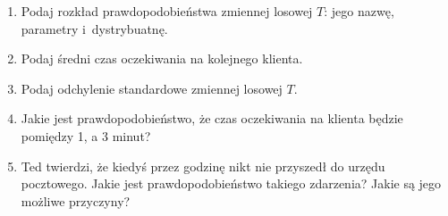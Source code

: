 \documentclass[twoside]{mwart}
\newcommand{\ans}[1]{}
\newenvironment{ansenv}{\comment}{\endcomment}
\newenvironment{ansenv}{\paragraph{Odpowiedź:}}{}
\newcommand{\ans}[1]{\begin{ansenv}#1\end{ansenv}}
\begin{document}
\begin{enumerate}
\begin{enumerate}
\item Podaj rozkład prawdopodobieństwa zmiennej losowej $T$: jego nazwę, parametry i~dystrybuatnę.
\ans
{
Rozkład wykładniczy
\begin{gather*}
F(x) = \begin{cases} 1-e^{-\lambda x} & x>0 \\ 0 & \text{wpp} \end{cases} \\
P(T<2)=F(2)=\frac{48}{50} \\
1-e^{-2\lambda}=\frac{24}{25} \\
e^{-2\lambda}=\frac{1}{25} \\ 
-2\lambda = \ln \frac{1}{25} = -2 \ln 5 \\
\lambda = \ln 5 \approx 1{,}609
\end{gather*}
}
\item Podaj średni czas oczekiwania na kolejnego klienta.
\ans{ $ET = \frac{1}{\lambda} = \frac{1}{\ln 5} \approx 0{,}621$ }
\item Podaj odchylenie standardowe zmiennej losowej $T$.
\ans{$DT=ET=\frac{1}{\lambda} = \frac{1}{\ln 5} \approx 0{,}621$ }
\item Jakie jest prawdopodobieństwo, że czas oczekiwania na klienta będzie pomiędzy 1, a 3 minut?
\ans{$P(1\leq T\leq 3) = F(3)-F(1) = 1-e^{-3\lambda}-(1-e^{-\lambda}) = e^{-\lambda}-e^{-3\lambda}=5^{-1}-5^{-3}=\frac{5^2-1}{5^3}=\frac{24}{125}=0{,}192$}
\item Ted twierdzi, że kiedyś przez godzinę nikt nie przyszedł do urzędu pocztowego. Jakie jest prawdopodobieństwo takiego zdarzenia? Jakie są jego możliwe przyczyny?
\ans{$P(T>60)=1-F(60)=1-(1-e^{-60\lambda}) = 5^{-60} \approx 0$}
\end{enumerate}


\end{enumerate}
\end{document}
